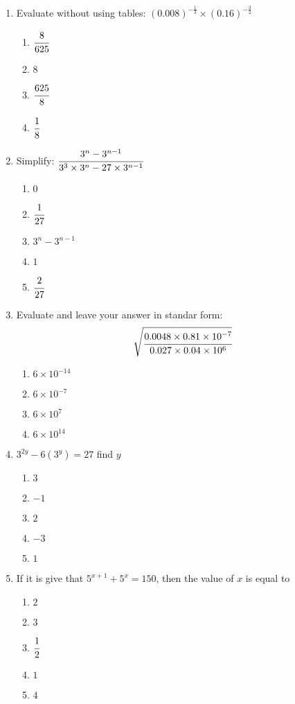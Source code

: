 \begin{multicols}{2}
\begin{enumerate}[label={\arabic*.}]
\item Evaluate without using tables: $(0.008)^{-\frac{1}{3}} \times (0.16)^{-\frac{3}{2}}$
	\begin{enumerate}[label={\Alph*.}]
	\item \(\cfrac{8}{625}\)
	\item \(8\)
	\item \(\cfrac{625}{8}\)
	\item \(\cfrac{1}{8}\)
	\end{enumerate}
\item Simplify: $\cfrac{3^n - 3^{n-1}}{3^3 \times 3^n - 27 \times 3^{n-1}}$
	\begin{enumerate}[label={\Alph*.}]
	\item \(0\)
	\item \(\cfrac{1}{27}\)
	\item \(3^n - 3^{n-1}\)
	\item \(1\)
	\item \(\cfrac{2}{27}\)
	\end{enumerate}
\item Evaluate and leave your answer in standar form: 
$$\sqrt{\cfrac{0.0048 \times 0.81 \times 10^{-7}}{0.027 \times 0.04 \times 10^6}}$$
	\begin{enumerate}[label={\Alph*.}]
	\item \(6 \times 10^{-14}\)
	\item \(6 \times 10^{-7}\)
	\item \(6 \times 10^7\)
	\item \(6 \times 10^{14}\)
	\end{enumerate}
\item $3^{2y} - 6(3^y) = 27$ find $y$
	\begin{enumerate}[label={\Alph*.}]
	\item \(3\)
	\item \(-1\)
	\item \(2\)
	\item \(-3\)
	\item \(1\)
	\end{enumerate}
\item If it is give that $5^{x+1} + 5^x = 150$, then the value of $x$ is equal to
	\begin{enumerate}[label={\Alph*.}]
	\item \(2\)
	\item \(3\)
	\item \(\cfrac{1}{2}\)
	\item \(1\)
	\item \(4\)
	\end{enumerate}

\end{enumerate}
\end{multicols}

